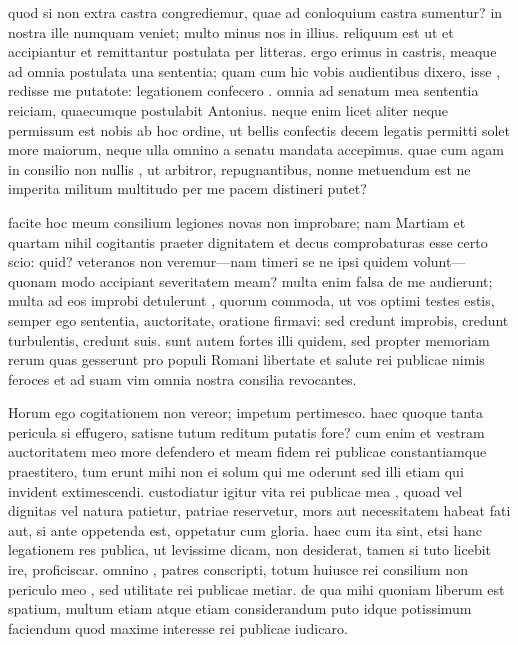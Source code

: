  quod si non extra castra congrediemur, quae ad conloquium castra sumentur? in nostra ille numquam veniet; multo minus nos in illius. reliquum est ut et accipiantur et remittantur postulata per litteras. ergo erimus in castris, meaque ad omnia postulata una sententia; quam cum hic vobis audientibus dixero, isse , redisse me putatote: legationem confecero . omnia ad senatum mea sententia reiciam, quaecumque postulabit Antonius. neque enim licet aliter neque permissum est nobis ab hoc ordine, ut bellis confectis decem legatis permitti solet more maiorum, neque ulla omnino a senatu mandata accepimus. quae cum agam in consilio non nullis , ut arbitror, repugnantibus, nonne metuendum est ne imperita militum multitudo per me pacem distineri putet?

 facite hoc meum consilium legiones novas non improbare; nam Martiam et quartam nihil cogitantis praeter dignitatem et decus comprobaturas esse certo scio: quid? veteranos non veremur—nam timeri se ne ipsi quidem volunt—quonam modo accipiant severitatem meam? multa enim falsa de me audierunt; multa ad eos improbi detulerunt , quorum commoda, ut vos optimi testes estis, semper ego sententia, auctoritate, oratione firmavi: sed credunt improbis, credunt turbulentis, credunt suis. sunt autem fortes illi quidem, sed propter memoriam rerum quas gesserunt pro populi Romani libertate et salute rei publicae nimis feroces et ad suam vim omnia nostra consilia revocantes.

 Horum ego cogitationem non vereor; impetum pertimesco. haec quoque tanta pericula si effugero, satisne tutum reditum putatis fore? cum enim et vestram auctoritatem meo more defendero et meam fidem rei publicae constantiamque praestitero, tum erunt mihi non ei solum qui me oderunt sed illi etiam qui invident extimescendi. custodiatur igitur vita rei publicae mea , quoad vel dignitas vel natura patietur, patriae reservetur, mors aut necessitatem habeat fati aut, si ante oppetenda est, oppetatur cum gloria. haec cum ita sint, etsi hanc legationem res publica, ut levissime dicam, non desiderat, tamen si tuto licebit ire, proficiscar. omnino , patres conscripti, totum huiusce rei consilium non periculo meo , sed utilitate rei publicae metiar. de qua mihi quoniam liberum est spatium, multum etiam atque etiam considerandum puto idque potissimum faciendum quod maxime interesse rei publicae iudicaro.
